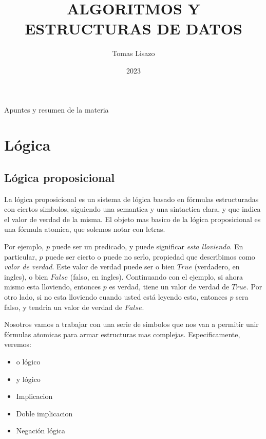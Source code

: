 \documentclass{article}
\begin{document}

\title{ALGORITMOS Y ESTRUCTURAS DE DATOS}
\author{Tomas Lisazo}
\date{2023}

\maketitle

\begin{center}
\begin{large}
Apuntes y resumen de la materia
\end{large}
\end{center}

\newpage
\renewcommand{\contentsname}{Indice}
\tableofcontents
\newpage
{}
\setcounter{page}{3}

\section{Lógica}

\subsection{Lógica proposicional}

La lógica proposicional es un sistema de lógica basado en fórmulas estructuradas con ciertos simbolos, siguiendo una semantica y una sintactica clara, y que indica el valor de verdad de la misma. El objeto mas basico de la lógica proposicional es una fórmula atomica, que solemos notar con letras.

Por ejemplo, $p$ puede ser un predicado, y puede significar \textit{esta lloviendo}. En particular, $p$ puede ser cierto o puede no serlo, propiedad que describimos como \textit{valor de verdad}. Este valor de verdad puede ser o bien $True$ (verdadero, en ingles), o bien $False$ (falso, en ingles). Continuando con el ejemplo, si ahora mismo esta lloviendo, entonces $p$ es verdad, tiene un valor de verdad de $True$. Por otro lado, si no esta lloviendo cuando usted está leyendo esto, entonces $p$ sera falso, y tendria un valor de verdad de $False$.

Nosotros vamos a trabajar con una serie de simbolos que nos van a permitir unir fórmulas atomicas para armar estructuras mas complejas. Especificamente, veremos:

\begin{multicols}{3}
\begin{itemize}
	\item o lógico
	\item y lógico
	\item Implicacion
	\item Doble implicacion
	\item Negación lógica
\end{itemize}
\end{multicols}
\end{document}
